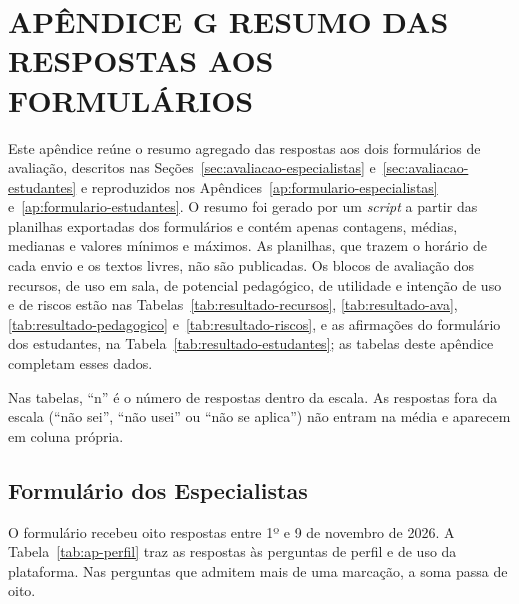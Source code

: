 \chapter[APÊNDICE G -- RESUMO DAS RESPOSTAS AOS FORMULÁRIOS]{{\centering APÊNDICE G \textendash{} RESUMO DAS RESPOSTAS AOS FORMULÁRIOS}}  \label{ap:respostas}

Este apêndice reúne o resumo agregado das respostas aos dois formulários de avaliação, descritos nas Seções~\ref{sec:avaliacao-especialistas} e~\ref{sec:avaliacao-estudantes} e reproduzidos nos Apêndices~\ref{ap:formulario-especialistas} e~\ref{ap:formulario-estudantes}. O resumo foi gerado por um \textit{script} a partir das planilhas exportadas dos formulários e contém apenas contagens, médias, medianas e valores mínimos e máximos. As planilhas, que trazem o horário de cada envio e os textos livres, não são publicadas. Os blocos de avaliação dos recursos, de uso em sala, de potencial pedagógico, de utilidade e intenção de uso e de riscos estão nas Tabelas~\ref{tab:resultado-recursos}, \ref{tab:resultado-ava}, \ref{tab:resultado-pedagogico} e~\ref{tab:resultado-riscos}, e as afirmações do formulário dos estudantes, na Tabela~\ref{tab:resultado-estudantes}; as tabelas deste apêndice completam esses dados.

Nas tabelas, ``n'' é o número de respostas dentro da escala. As respostas fora da escala (``não sei'', ``não usei'' ou ``não se aplica'') não entram na média e aparecem em coluna própria.

\section{Formulário dos Especialistas}

O formulário recebeu oito respostas entre 1º e 9 de novembro de 2026. A Tabela~\ref{tab:ap-perfil} traz as respostas às perguntas de perfil e de uso da plataforma. Nas perguntas que admitem mais de uma marcação, a soma passa de oito.

